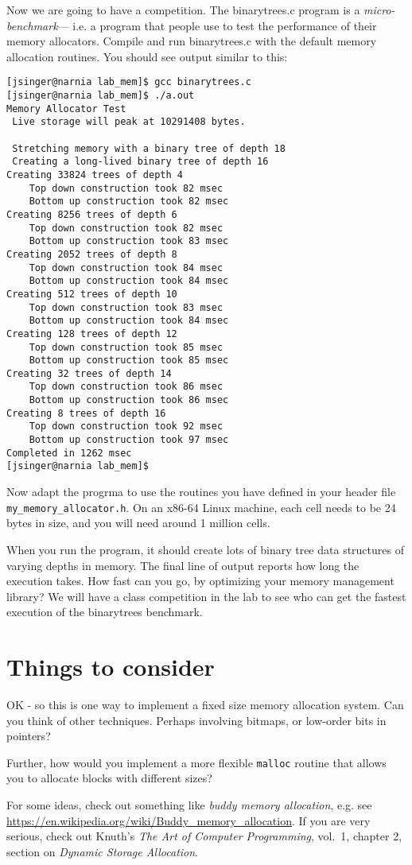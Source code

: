 \documentclass{article}
\begin{document}
Now we are going to have a competition. The binarytrees.c program
is a \emph{micro-benchmark}--- i.e. a program that people use to
test the performance of their memory allocators.
Compile and run binarytrees.c with the default memory allocation
routines. You should see output similar to this:
\begin{lstlisting}
[jsinger@narnia lab_mem]$ gcc binarytrees.c
[jsinger@narnia lab_mem]$ ./a.out
Memory Allocator Test
 Live storage will peak at 10291408 bytes.

 Stretching memory with a binary tree of depth 18
 Creating a long-lived binary tree of depth 16
Creating 33824 trees of depth 4
	Top down construction took 82 msec
	Bottom up construction took 82 msec
Creating 8256 trees of depth 6
	Top down construction took 82 msec
	Bottom up construction took 83 msec
Creating 2052 trees of depth 8
	Top down construction took 84 msec
	Bottom up construction took 84 msec
Creating 512 trees of depth 10
	Top down construction took 83 msec
	Bottom up construction took 84 msec
Creating 128 trees of depth 12
	Top down construction took 85 msec
	Bottom up construction took 85 msec
Creating 32 trees of depth 14
	Top down construction took 86 msec
	Bottom up construction took 86 msec
Creating 8 trees of depth 16
	Top down construction took 92 msec
	Bottom up construction took 97 msec
Completed in 1262 msec
[jsinger@narnia lab_mem]$ 
\end{lstlisting}

Now adapt the progrma to use the routines you have defined in your header file
\lstinline|my_memory_allocator.h|. On an x86-64 Linux machine, each cell needs to be 24 bytes in size, and you will need around 1 million cells.

When you run the program, it should create lots of binary tree data
structures of varying depths in memory. The final line of output reports how long the execution takes. How fast can you go, by optimizing your memory management library? We will have a class competition in the lab to see who can get the fastest execution
of the binarytrees benchmark.

\section{Things to consider}

OK - so this is one way to implement a fixed size memory allocation
system. Can you think of other techniques. Perhaps involving
bitmaps, or low-order bits in pointers?

Further, how would you implement a more flexible \lstinline|malloc|
routine that allows you to allocate blocks with different sizes?

For some ideas, check out something like \emph{buddy memory allocation}, e.g. see \url{https://en.wikipedia.org/wiki/Buddy_memory_allocation}. If you are very serious, check out Knuth's \emph{The Art of Computer Programming}, vol.\ 1, chapter 2, section on \emph{Dynamic Storage Allocation}.
\end{document}
